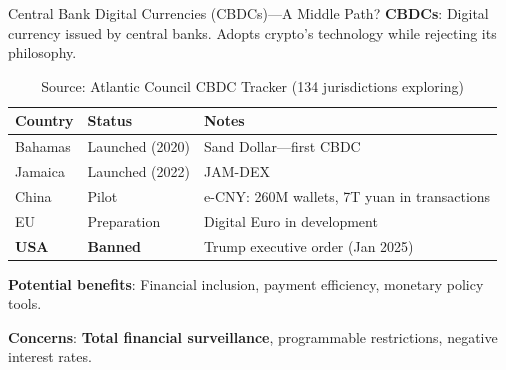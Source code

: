 ﻿\documentclass[aspectratio=169,11pt]{beamer}
\begin{document}
\begin{frame}{Central Bank Digital Currencies (CBDCs)---A Middle Path?}
\textbf{CBDCs}: Digital currency issued by central banks. Adopts crypto's technology while rejecting its philosophy.

\vspace{0.2em}
\begin{table}[h]
\centering
\footnotesize
\begin{tabular}{@{}llp{5cm}@{}}
\toprule
\textbf{Country} & \textbf{Status} & \textbf{Notes} \\
\midrule
Bahamas & Launched (2020) & Sand Dollar---first CBDC \\
Jamaica & Launched (2022) & JAM-DEX \\
China & Pilot & e-CNY: 260M wallets, 7T yuan in transactions \\
EU & Preparation & Digital Euro in development \\
\textbf{USA} & \textbf{Banned} & Trump executive order (Jan 2025) \\
\bottomrule
\end{tabular}
\caption*{\footnotesize Source: Atlantic Council CBDC Tracker (134 jurisdictions exploring)}
\end{table}

\textbf{Potential benefits}: Financial inclusion, payment efficiency, monetary policy tools.

\textbf{Concerns}: \textbf{Total financial surveillance}, programmable restrictions, negative interest rates.
\end{frame}
\end{document}
